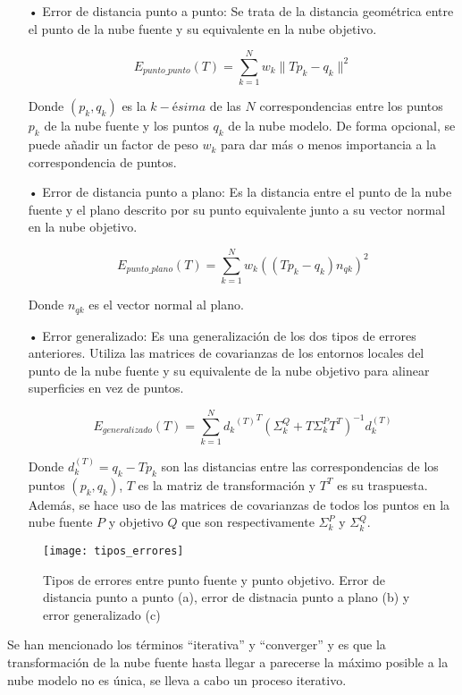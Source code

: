\begin{itemize}
\item[•]Error de distancia punto a punto:
Se trata de la distancia geométrica entre el punto de la nube fuente y su equivalente en la nube objetivo.

$$E_{punto\_punto}(T)=\sum_{k=1}^{N} w_{k}\| Tp_{k}-q_{k} \|^2$$

Donde $(p_{k},q_{k})$ es la $k-ésima$ de las $N$ correspondencias entre los puntos $p_k$ de la nube fuente y los puntos $q_k$ de la nube modelo. De forma opcional, se puede añadir un factor de peso $w_k$ para dar más o menos importancia a la correspondencia de puntos.

\item[•]Error de distancia punto a plano:
Es la distancia entre el punto de la nube fuente y el plano descrito por su punto equivalente junto a su vector normal en la nube objetivo.

$$E_{punto\_plano}(T)=\sum_{k=1}^{N} w_{k} ((Tp_{k}-q_{k})n_{qk}) ^2$$

Donde $n_{qk}$ es el vector normal al plano.

\item[•]Error generalizado:
Es una generalización de los dos tipos de errores anteriores. Utiliza las matrices de covarianzas de los entornos locales del punto de la nube fuente y su equivalente de la nube objetivo para alinear superficies en vez de puntos.

$$E_{generalizado}(T)=\sum_{k=1}^{N} {{d_{k}}^{(T)}}^{T} (\Sigma_{k}^{Q}+T\Sigma_{k}^{P}T^{T})^{-1}d_{k}^{(T)}$$

Donde $d_{k}^{(T)}=q_{k}-Tp_{k}$ son las distancias entre las correspondencias de los puntos $(p_{k},q_{k})$, $T$ es la matriz de transformación y $T^T$ es su traspuesta. Además, se hace uso de las matrices de covarianzas de todos los puntos en la nube fuente $P$ y objetivo $Q$ que son respectivamente $\Sigma_{k}^{P}$ y $\Sigma_{k}^{Q}$.
\end{itemize}

\begin{figure}
\centering
\texttt{[image: tipos\_errores]}
\caption{Tipos de errores entre punto fuente y punto objetivo. Error de distancia punto a punto (a), error de distnacia punto a plano (b) y error generalizado (c)}\label{fig:tipos_errores}
\end{figure}


Se han mencionado los términos ``iterativa'' y ``converger'' y es que la transformación de la nube fuente hasta llegar a parecerse la máximo posible a la nube modelo no es única, se lleva a cabo un proceso iterativo\cite{paper_registration}. 

